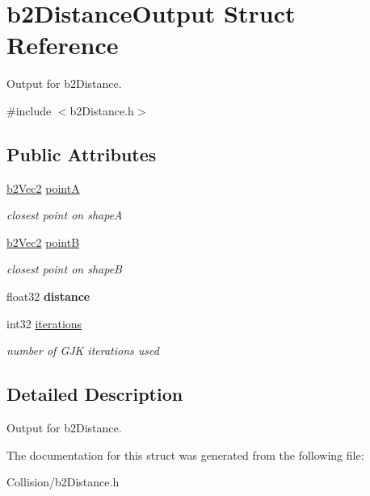 \hypertarget{structb2DistanceOutput}{}\section{b2\+Distance\+Output Struct Reference}
\label{structb2DistanceOutput}


Output for b2\+Distance.  




{\ttfamily \#include $<$b2\+Distance.\+h$>$}

\subsection*{Public Attributes}
\begin{DoxyCompactItemize}
\item 
\mbox{\label{structb2DistanceOutput_a7e0f1f44a64e596dc7d37570c69eefce}} 
\mbox{\hyperlink{structb2Vec2}{b2\+Vec2}} \mbox{\hyperlink{structb2DistanceOutput_a7e0f1f44a64e596dc7d37570c69eefce}{pointA}}
\begin{DoxyCompactList}\small\item\em closest point on shapeA \end{DoxyCompactList}\item 
\mbox{\label{structb2DistanceOutput_aa85beca17337a506cd4a924d0c6f92cc}} 
\mbox{\hyperlink{structb2Vec2}{b2\+Vec2}} \mbox{\hyperlink{structb2DistanceOutput_aa85beca17337a506cd4a924d0c6f92cc}{pointB}}
\begin{DoxyCompactList}\small\item\em closest point on shapeB \end{DoxyCompactList}\item 
\mbox{\label{structb2DistanceOutput_ae67f480ff37d4ab732e6366f485c7f55}} 
float32 {\bfseries distance}
\item 
\mbox{\label{structb2DistanceOutput_ae2d4c84dd3d05ea4f4d20c91099ec8d5}} 
int32 \mbox{\hyperlink{structb2DistanceOutput_ae2d4c84dd3d05ea4f4d20c91099ec8d5}{iterations}}
\begin{DoxyCompactList}\small\item\em number of G\+JK iterations used \end{DoxyCompactList}\end{DoxyCompactItemize}


\subsection{Detailed Description}
Output for b2\+Distance. 

The documentation for this struct was generated from the following file\+:\begin{DoxyCompactItemize}
\item 
Collision/b2\+Distance.\+h\end{DoxyCompactItemize}
